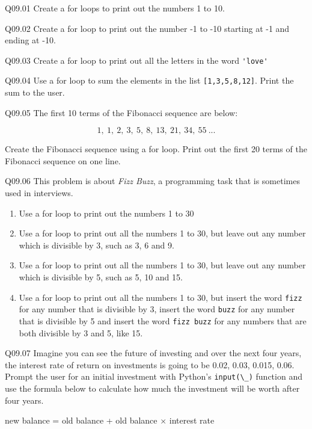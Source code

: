 \documentclass{book}
\newenvironment{problems}{}{}  %
\newcommand{\passthrough}[1]{#1}
\begin{document}
    
        \begin{problems}
        Q09.01 Create a for loops to print out the numbers 1 to 10.

Q09.02 Create a for loop to print out the number -1 to -10 starting at
-1 and ending at -10.

Q09.03 Create a for loop to print out all the letters in the word
\passthrough{\lstinline!'love'!}

Q09.04 Use a for loop to sum the elements in the list
\passthrough{\lstinline![1,3,5,8,12]!}. Print the sum to the user.

Q09.05 The first 10 terms of the Fibonacci sequence are below:

\[ 1, \ 1, \ 2, \ 3, \ 5, \ 8, \ 13, \ 21, \ 34, \ 55 \ ... \]

Create the Fibonacci sequence using a for loop. Print out the first 20
terms of the Fibonacci sequence on one line.

Q09.06 This problem is about \emph{Fizz Buzz}, a programming task that
is sometimes used in interviews.

\begin{enumerate}
\def\labelenumi{(\alph{enumi})}
\item
  Use a for loop to print out the numbers 1 to 30
\item
  Use a for loop to print out all the numbers 1 to 30, but leave out any
  number which is divisible by 3, such as 3, 6 and 9.
\item
  Use a for loop to print out all the numbers 1 to 30, but leave out any
  number which is divisible by 5, such as 5, 10 and 15.
\item
  Use a for loop to print out all the numbers 1 to 30, but insert the
  word \passthrough{\lstinline!fizz!} for any number that is divisible
  by 3, insert the word \passthrough{\lstinline!buzz!} for any number
  that is divisible by 5 and insert the word
  \passthrough{\lstinline!fizz buzz!} for any numbers that are both
  divisible by 3 and 5, like 15.
\end{enumerate}

Q09.07 Imagine you can see the future of investing and over the next
four years, the interest rate of return on investments is going to be
0.02, 0.03, 0.015, 0.06. Prompt the user for an initial investment with
Python's \passthrough{\lstinline!input(\_)!} function and use the
formula below to calculate how much the investment will be worth after
four years.

new balance = old balance + old balance \(\times\) interest rate


\end{problems}
\end{document}
